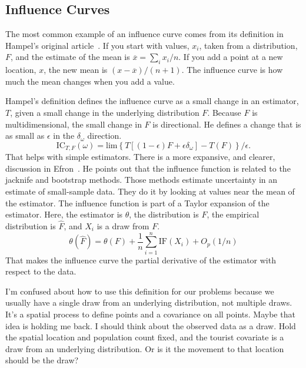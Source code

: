 \documentclass{article}
\begin{document}
\subsection{Influence Curves}

The most common example of an influence curve comes from its definition in Hampel's original article~\cite{hampel1974influence}. If you start with values, $x_i$, taken from a distribution, $F$, and the estimate of the mean is $\overbar{x} = \sum_i x_i / n$. If you add a point at a new location, $x$, the new mean is $(x-\overbar{x})/(n+1).$ The influence curve is how much the mean changes when you add a value.

Hampel's definition defines the influence curve as a small change in an estimator, $T$, given a small change in the underlying distribution $F$. Because $F$ is multidimensional, the small change in $F$ is directional. He defines a change that is as small as $\epsilon$ in the $\delta_\omega$ direction.
\begin{equation}
  \mbox{IC}_{T,F}(\omega)=\mbox{lim}\left\{T[(1-\epsilon)F+\epsilon\delta_\omega]-T(F)\right\}/\epsilon.
\end{equation}
That helps with simple estimators. There is a more expansive, and clearer, discussion in Efron~\cite{efron1982jackknife}. He points out that the influence function is related to the jacknife and bootstrap methods. Those methods estimate uncertainty in an estimate of small-sample data. They do it by looking at values near the mean of the estimator. The influence function is part of a Taylor expansion of the estimator. Here, the estimator is $\theta$, the distribution is $F$, the empirical distribution is $\hat{F}$, and $X_i$ is a draw from $F$.
\begin{equation}
  \theta(\hat{F})=\theta(F) + \frac{1}{n}\sum_{i=1}^{n} \mbox{IF}(X_i) + O_p\left(1/n\right)
\end{equation}
That makes the influence curve the partial derivative of the estimator with respect to the data.

I'm confused about how to use this definition for our problems because we usually have a single draw from an underlying distribution, not multiple draws. It's a spatial process to define points and a covariance on all points. Maybe that idea is holding me back. I should think about the observed data as a draw. Hold the spatial location and population count fixed, and the tourist covariate is a draw from an underlying distribution. Or is it the movement to that location should be the draw?
\end{document}
